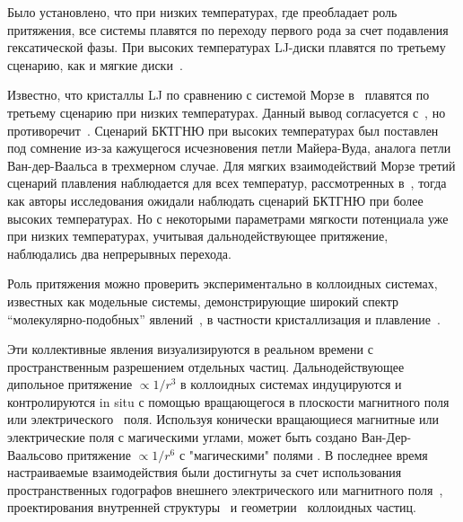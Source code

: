 Было установлено, что при низких температурах, где преобладает роль притяжения, все системы плавятся по переходу первого рода за счет подавления гексатической фазы.
При высоких температурах LJ-диски плавятся по третьему сценарию, как и мягкие диски~\cite{10.1103/physrevlett.114.035702}.

Известно, что кристаллы LJ по сравнению с системой Морзе в~\cite{10.1103/physrevb.103.094107} плавятся по третьему сценарию при низких температурах. 
Данный вывод согласуется с~\cite{10.1103/physreve.99.022145}, но противоречит~\cite{10.1103/physrevlett.114.035702}. 
Сценарий БКТГНЮ при высоких температурах был поставлен под сомнение из-за кажущегося исчезновения петли Майера-Вуда, аналога петли Ван-дер-Ваальса в трехмерном случае. 
Для мягких взаимодействий Морзе третий сценарий плавления наблюдается для всех температур, рассмотренных в~\cite{10.1103/physrevb.103.094107}, тогда как авторы исследования ожидали наблюдать сценарий БКТГНЮ при более высоких температурах. 
Но с некоторыми параметрами мягкости потенциала уже при низких температурах, учитывая дальнодействующее притяжение, наблюдались два непрерывных перехода.

Роль притяжения можно проверить экспериментально в коллоидных системах, известных как модельные системы, демонстрирующие широкий спектр ``молекулярно-подобных'' явлений~\cite{book.fernandez, book.ivlev, 10.1016/0370-1573(94)90017-5, 10.1038/natrevmats.2015.11, 10.1039/c9sm01953g}, в частности кристаллизация и плавление~\cite{10.1126/science.1112399, 10.1039/c2sm26473k, 10.1103/physrevlett.82.2721, 10.1103/physrevlett.85.3656, 10.1103/physrevlett.118.088003, 10.1039/c2sm27654b, 10.1126/science.1224763, 10.1038/s41598-021-97124-7}.

Эти коллективные явления визуализируются в реальном времени с пространственным разрешением отдельных частиц. 
Дальнодействующее дипольное притяжение $\propto 1/r^3$ в коллоидных системах индуцируются и контролируются in situ с помощью вращающегося в плоскости магнитного поля~\cite{10.1088/0034-4885/76/12/126601, 10.1039/c3sm50306b, 10.1039/c3sm27620a, 10.1103/physrevmaterials.2.025602} или электрического~\cite{10.1088/1367-2630/8/11/267, 10.1063/1.3115641, 10.1021/la2014804, 10.1021/la500178b, 10.1039/c1sm06414b, 10.1038/s41598-017-14001-y} поля.
Используя конически вращающиеся магнитные или электрические поля с магическими углами, может быть создано Ван-Дер-Ваальсово притяжение $\propto 1/r^6$ с "магическими" полями \cite{10.1021/la500896e, 10.1103/physrevlett.103.228301}.
В последнее время настраиваемые взаимодействия были достигнуты за счет использования пространственных годографов внешнего электрического или магнитного поля~\cite{10.1039/d0sm01046d}, проектирования внутренней структуры~\cite{10.1063/5.0055566} и геометрии~\cite{10.1063/5.0060705} коллоидных частиц.


